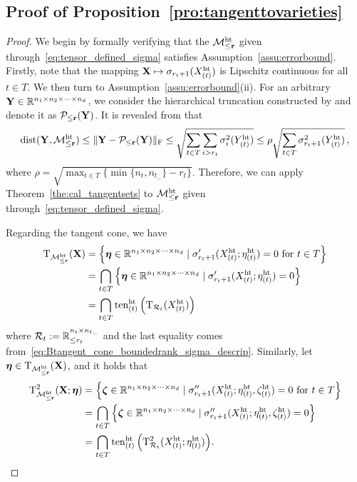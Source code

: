 \subsection{Proof of Proposition~\ref{pro:tangenttovarieties}}\label{app:prooftangentvariety}
\begin{proof}
We begin by formally verifying that the $\mathcal{M}_{\le \mathbf{r}}^{\mathrm{ht}}$ given through~\eqref{eq:tensor_defined_sigma} satisfies Assumption~\ref{assu:errorbound}. Firstly, note that the mapping $\mathbf{X}\mapsto\sigma_{r_t+1}(X^{\mathrm{ht}}_{(t)})$ is Lipschitz continuous for all $t\in T$. We then turn to Assumption~\ref{assu:errorbound}(ii). For an arbitrary $\mathbf{Y}\in\mathbb{R}^{n_1\times n_2\times\cdots\times n_d}$, we consider the hierarchical truncation constructed by \cite[Lemma~3.15]{grasedyck2010hierarchicalSVD} and denote it as $\mathcal{P}_{\le \mathbf{r}}(\mathbf{Y})$.  It is revealed from \cite[Theorem~3.11]{grasedyck2010hierarchicalSVD} that 
\begin{equation*}
    \operatorname{dist}(\mathbf{Y},\mathcal{M}^{\mathrm{ht}}_{\le \mathbf{r}})\le \|\mathbf{Y}-\mathcal{P}_{\le \mathbf{r}}(\mathbf{Y})\|_{\mathrm{F}} \le \sqrt{\sum_{t\in T}\sum_{i>r_t}\sigma^2_{i}(Y^{{\mathrm{ht}}}_{(t)})} \le  \rho\sqrt{\sum_{t\in T} \sigma^2_{r_t+1}(Y^{{\mathrm{ht}}}_{(t)})}\,,
\end{equation*}
where $\rho=\sqrt{\max_{t\in T}\{\min\{n_t,n_{t_-}\}-r_t\}}$. Therefore, we can apply Theorem~\ref{the:cal_tangentsets} to $\mathcal{M}_{\le \mathbf{r}}^{\mathrm{ht}}$ given through~\eqref{eq:tensor_defined_sigma}.

Regarding the tangent cone, we have
\begin{align*}
    \Btangent_{\boundedht}(\tensX) &= \hkh{\tenseta\in\tensorspace \mid \sigma^\prime_{r_t+1}(X^\mht_{(t)};\eta^\mht_{(t)})=0\ \text{for}\ t\in T}
    \\
    &=\bigcap_{t\in T} \hkh{\tenseta\in\tensorspace \mid \sigma^\prime_{r_t+1}(X^\mht_{(t)};\eta^\mht_{(t)})=0}
    \\
    &= \bigcap_{t\in T}{\tensorize_{(t)}^\mht\kh{\Btangent_{\ranifold_t}(X^\mht_{(t)})}}
\end{align*}
where $\mathcal{R}_t:=\mathbb{R}_{\le r_t}^{n_t\times n_{t_-}}$ and the last equality comes from~\eqref{eq:Btangent_cone_boundedrank_sigma_descrip}. Similarly, let $\bm{\eta}\in \mathrm{T}_{\mathcal{M}_{\le \mathbf{r}}^{\mathrm{ht}}}(\mathbf{X})$, and it holds that
\begin{align*}
    \tangenttwo_{\boundedht}(\tensX;\tenseta) &= \hkh{\tenszeta\in\tensorspace \mid \sigma^{\prime\prime}_{r_t+1}(X^\mht_{(t)};\eta^\mht_{(t)},\zeta^\mht_{(t)})=0\ \text{for}\ t\in T}
    \\
    &=\bigcap_{t\in T} \hkh{\tenszeta\in\tensorspace \mid \sigma^{\prime\prime}_{r_t+1}(X^\mht_{(t)};\eta^\mht_{(t)},\zeta^\mht_{(t)})=0}
    \\
    &= \bigcap_{t\in T}{\tensorize_{(t)}^\mht\kh{\tangenttwo_{\ranifold_t}(X^\mht_{(t)};\eta^\mht_{(t)})}}.
\end{align*}
\end{proof}


